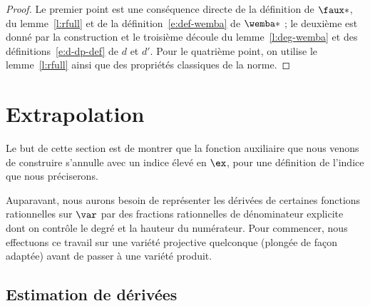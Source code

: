 \begin{proof} \todo[vérifier]
  Le premier point est une conséquence directe de la définition de \( \faux*
  \), du lemme~\ref{l:rfull} et de la définition~\eqref{e:def-wemba} de \(
    \wemba* \) ; le deuxième est donné par la construction et le troisième
  découle du lemme~\ref{l:deg-wemba} et des définitions~\eqref{e:d-dp-def} de
  \( d \) et \( d' \).  Pour le quatrième point, on utilise le
  lemme~\ref{l:rfull} ainsi que des propriétés classiques de la norme.
\end{proof}



\section{Extrapolation} \label{sec:vojta-extrap}

Le but de cette section est de montrer que la fonction auxiliaire que nous
venons de construire s'annulle avec un indice élevé en \( \ex \), pour une
définition de l'indice que nous préciserons.

Auparavant, nous aurons besoin de représenter les dérivées de certaines
fonctions rationnelles sur \( \var \) par des fractions rationnelles de
dénominateur explicite dont on contrôle le degré et la hauteur du numérateur.
Pour commencer, nous effectuons ce travail sur une variété projective
quelconque (plongée de façon adaptée) avant de passer à une variété produit.


\subsection{Estimation de dérivées} \label{sec:vojta-param}

